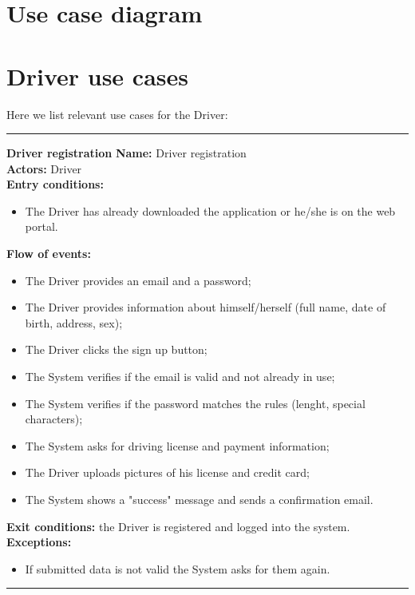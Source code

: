 \section{Use case diagram}
\section{Driver use cases}
Here we list relevant use cases for the Driver:\\
\begin{center}
\noindent\rule{8cm}{1.0pt}
\end{center}

\textbf{\large Driver registration}
\bigbreak
\textbf{Name:} Driver registration \\
\textbf{Actors:} Driver \\
\textbf{Entry conditions:} 
\begin{itemize}
\item The Driver has already downloaded the application or he/she is on the web portal.
\end{itemize}
\textbf{Flow of events:} 
\begin{itemize}
\item The Driver provides an email and a password;
\item The Driver provides information about himself/herself (full name, date of birth, address, sex);
\item The Driver clicks the sign up button;
\item The System verifies if the email is valid and not already in use;
\item The System verifies if the password matches the rules (lenght, special characters);
\item The System asks for driving license and payment information;
\item The Driver uploads pictures of his license and credit card;
\item The System shows a "success" message and sends a confirmation email.
\end{itemize}
\textbf{Exit conditions:} the Driver is registered and logged into the system.\\
\textbf{Exceptions:} 
\begin{itemize}
\item If submitted data is not valid the System asks for them again.
\end{itemize}

\begin{center}
\noindent\rule{8cm}{1.0pt}
\end{center}


